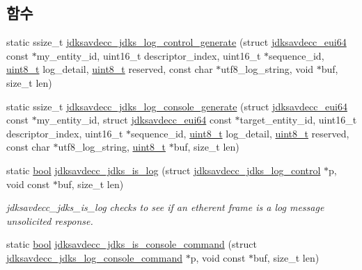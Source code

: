 \subsection*{함수}
\begin{DoxyCompactItemize}
\item 
static ssize\+\_\+t \hyperlink{group__jdks__log_gac5d38dde1fbdb45e3d413b9e1cae5ac3}{jdksavdecc\+\_\+jdks\+\_\+log\+\_\+control\+\_\+generate} (struct \hyperlink{structjdksavdecc__eui64}{jdksavdecc\+\_\+eui64} const $\ast$my\+\_\+entity\+\_\+id, uint16\+\_\+t descriptor\+\_\+index, uint16\+\_\+t $\ast$sequence\+\_\+id, \hyperlink{stdint_8h_aba7bc1797add20fe3efdf37ced1182c5}{uint8\+\_\+t} log\+\_\+detail, \hyperlink{stdint_8h_aba7bc1797add20fe3efdf37ced1182c5}{uint8\+\_\+t} reserved, const char $\ast$utf8\+\_\+log\+\_\+string, void $\ast$buf, size\+\_\+t len)
\item 
static ssize\+\_\+t \hyperlink{group__jdks__log_gafe5b02f5ce9b2bf01f6b6f2213e1a209}{jdksavdecc\+\_\+jdks\+\_\+log\+\_\+console\+\_\+generate} (struct \hyperlink{structjdksavdecc__eui64}{jdksavdecc\+\_\+eui64} const $\ast$my\+\_\+entity\+\_\+id, struct \hyperlink{structjdksavdecc__eui64}{jdksavdecc\+\_\+eui64} const $\ast$target\+\_\+entity\+\_\+id, uint16\+\_\+t descriptor\+\_\+index, uint16\+\_\+t $\ast$sequence\+\_\+id, \hyperlink{stdint_8h_aba7bc1797add20fe3efdf37ced1182c5}{uint8\+\_\+t} log\+\_\+detail, \hyperlink{stdint_8h_aba7bc1797add20fe3efdf37ced1182c5}{uint8\+\_\+t} reserved, const char $\ast$utf8\+\_\+log\+\_\+string, \hyperlink{stdint_8h_aba7bc1797add20fe3efdf37ced1182c5}{uint8\+\_\+t} $\ast$buf, size\+\_\+t len)
\item 
static \hyperlink{avb__gptp_8h_af6a258d8f3ee5206d682d799316314b1}{bool} \hyperlink{group__jdks__log_ga794436f7d0288c29ac4c0002b27c615b}{jdksavdecc\+\_\+jdks\+\_\+is\+\_\+log} (struct \hyperlink{structjdksavdecc__jdks__log__control}{jdksavdecc\+\_\+jdks\+\_\+log\+\_\+control} $\ast$p, void const $\ast$buf, size\+\_\+t len)
\begin{DoxyCompactList}\small\item\em jdksavdecc\+\_\+jdks\+\_\+is\+\_\+log checks to see if an etherent frame is a log message unsolicited response. \end{DoxyCompactList}\item 
static \hyperlink{avb__gptp_8h_af6a258d8f3ee5206d682d799316314b1}{bool} \hyperlink{group__jdks__log_gada9d0277e95b72f1841157ad9941cfbc}{jdksavdecc\+\_\+jdks\+\_\+is\+\_\+console\+\_\+command} (struct \hyperlink{structjdksavdecc__jdks__log__console__command}{jdksavdecc\+\_\+jdks\+\_\+log\+\_\+console\+\_\+command} $\ast$p, void const $\ast$buf, size\+\_\+t len)

\end{DoxyCompactItemize}

